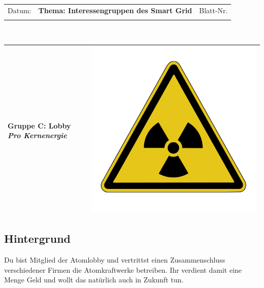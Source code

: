 \documentclass[11pt,a4paper,DIV=10,parskip=half,BCOR=0mm]{scrartcl}
\begin{document}
%
\setlength{\tabcolsep}{3mm} %
\noindent
\begin{tabularx}{\textwidth}{|l|T|l|}
\hline
Datum: & \rule{0pt}{5mm} \textbf{\textsf{Thema: Interessengruppen des Smart Grid}} & Blatt-Nr. \\
&&\\ 
\hline
\end{tabularx}
\rule{0pt}{3mm} \\
\setlength{\tabcolsep}{0mm} %
\begin{tabularx}{\linewidth}{lXr}
{\Large\textsf{\textbf{Gruppe C:} Lobby \textit{Pro Kernenergie}}} & & \includegraphics[scale=0.04]{images/atom}\\
\hline
\end{tabularx}
%
\subsection*{Hintergrund}
Du bist Mitglied der Atomlobby  und vertrittst einen Zusammenschluss
verschiedener Firmen die Atomkraftwerke betreiben. Ihr verdient damit
eine Menge Geld und wollt das natürlich auch in Zukunft tun.
\end{document}

